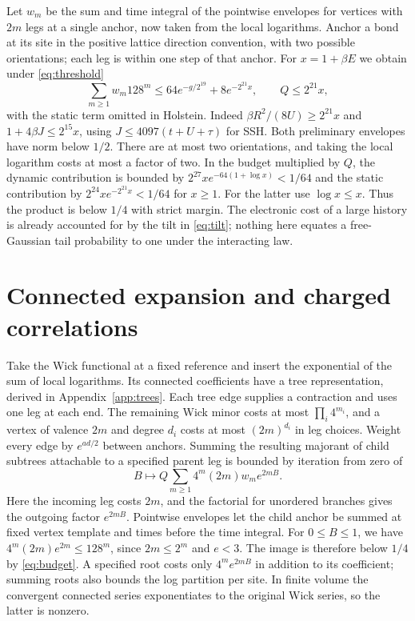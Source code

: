 \documentclass[11pt]{article}
\begin{document}
Let $w_m$ be the sum and time integral of the pointwise envelopes for vertices with $2m$ legs at a single anchor, now taken from the local logarithms. Anchor a bond at its site in the positive lattice direction convention, with two possible orientations; each leg is within one step of that anchor. For $x=1+\beta E$ we obtain under \eqref{eq:threshold}
\begin{equation}\label{eq:budget}
 \sum_{m\ge1} w_m128^m\le 64e^{-g/2^{19}}+8e^{-2^{21}x},
 \qquad Q\le 2^{21}x,
\end{equation}
with the static term omitted in Holstein. Indeed $\beta R^2/(8U)\ge 2^{21}x$ and $1+4\beta J\le2^{15}x$, using $J\le4097(t+U+\tau)$ for SSH. Both preliminary envelopes have norm below $1/2$. There are at most two orientations, and taking the local logarithm costs at most a factor of two. In the budget multiplied by $Q$, the dynamic contribution is bounded by $2^{27}x e^{-64(1+\log x)}<1/64$ and the static contribution by $2^{24}x e^{-2^{21}x}<1/64$ for $x\ge1$. For the latter use $\log x\le x$. Thus the product is below $1/4$ with strict margin. The electronic cost of a large history is already accounted for by the tilt in \eqref{eq:tilt}; nothing here equates a free-Gaussian tail probability to one under the interacting law.

\section{Connected expansion and charged correlations}\label{sec:connected}
Take the Wick functional at a fixed reference and insert the exponential of the sum of local logarithms. Its connected coefficients have a tree representation, derived in Appendix~\ref{app:trees}. Each tree edge supplies a contraction and uses one leg at each end. The remaining Wick minor costs at most $\prod_i 4^{m_i}$, and a vertex of valence $2m$ and degree $d_i$ costs at most $(2m)^{d_i}$ in leg choices. Weight every edge by $e^{a d/2}$ between anchors. Summing the resulting majorant of child subtrees attachable to a specified parent leg is bounded by iteration from zero of
\begin{equation}\label{eq:recursion}
 B\longmapsto Q\sum_{m\ge1}4^m(2m)w_m e^{2mB}.
\end{equation}
Here the incoming leg costs $2m$, and the factorial for unordered branches gives the outgoing factor $e^{2mB}$. Pointwise envelopes let the child anchor be summed at fixed vertex template and times before the time integral. For $0\le B\le1$, we have $4^m(2m)e^{2m}\le128^m$, since $2m\le2^m$ and $e<3$. The image is therefore below $1/4$ by \eqref{eq:budget}. A specified root costs only $4^m e^{2mB}$ in addition to its coefficient; summing roots also bounds the log partition per site. In finite volume the convergent connected series exponentiates to the original Wick series, so the latter is nonzero.
\end{document}
